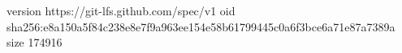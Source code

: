 version https://git-lfs.github.com/spec/v1
oid sha256:e8a150a5f84c238e8e7f9a963ee154e58b61799445c0a6f3bce6a71e87a7389a
size 174916
